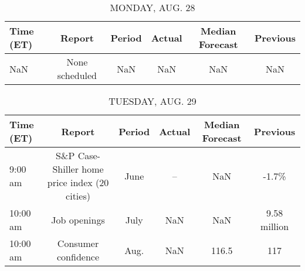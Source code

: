 \documentclass{article}%
\begin{document}
%
\normalsize%


\begin{table}[htbp]%
\caption{MONDAY, AUG. 28}%
\centering%
\begin{adjustbox}{width=1\textwidth}%
\begin{tabular}{lccccc}
\toprule
Time (ET) &         Report & Period & Actual & Median Forecast & Previous \\
\midrule
      NaN & None scheduled &    NaN &    NaN &             NaN &      NaN \\
\bottomrule
\end{tabular}
%
\end{adjustbox}%
\end{table}

%


\begin{table}[htbp]%
\caption{TUESDAY, AUG. 29}%
\centering%
\begin{adjustbox}{width=1\textwidth}%
\begin{tabular}{lccccc}
\toprule
Time (ET) &                                        Report & Period & Actual & Median Forecast &     Previous \\
\midrule
  9:00 am & S\&P Case-Shiller home price index (20 cities) &   June &     -- &             NaN &        -1.7\% \\
 10:00 am &                                  Job openings &   July &    NaN &             NaN & 9.58 million \\
 10:00 am &                           Consumer confidence &   Aug. &    NaN &           116.5 &          117 \\
\bottomrule
\end{tabular}
%
\end{adjustbox}%
\end{table}

%
\end{document}
